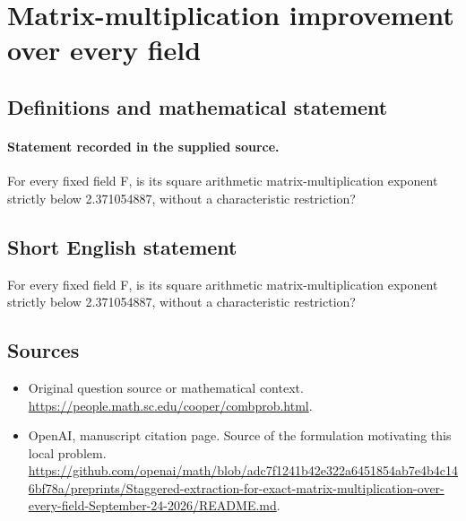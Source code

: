 \documentclass[11pt]{article}
\begin{document}
\section*{Matrix-multiplication improvement over every field}\label{30007442}
\subsection{Definitions and mathematical statement}
\paragraph{Statement recorded in the supplied source.}
For every fixed field F, is its square arithmetic matrix-multiplication exponent strictly below 2.371054887, without a characteristic restriction?
\subsection{Short English statement}
For every fixed field F, is its square arithmetic matrix-multiplication exponent strictly below 2.371054887, without a characteristic restriction?
\subsection{Sources}
\begin{itemize}
\item[S1] Original question source or mathematical context.
\url{https://people.math.sc.edu/cooper/combprob.html}.
\item[S2] OpenAI, manuscript citation page. Source of the formulation motivating this local problem.
\url{https://github.com/openai/math/blob/adc7f1241b42e322a6451854ab7e4b4c146bf78a/preprints/Staggered-extraction-for-exact-matrix-multiplication-over-every-field-September-24-2026/README.md}.
\end{itemize}
\end{document}

